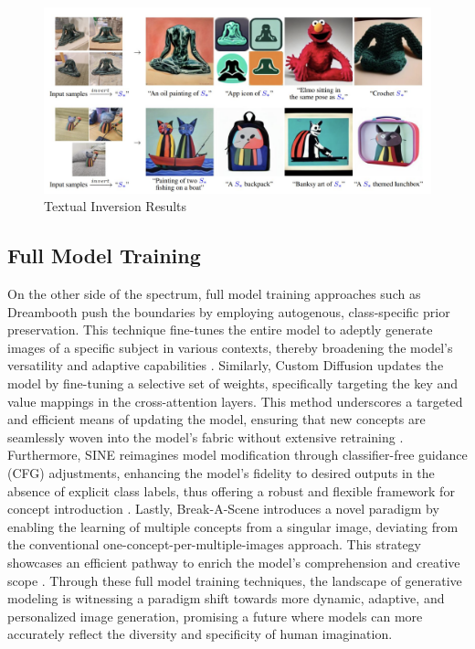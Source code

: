 \begin{figure}[h!]
    \centering
    \includegraphics[width=\textwidth]{images/ti.png}
    \caption{Textual Inversion Results \cite{textualinversion2022}}
\end{figure}


\subsection{Full Model Training}
On the other side of the spectrum, full model training approaches such as Dreambooth push the boundaries by employing autogenous, class-specific prior preservation. This technique fine-tunes the entire model to adeptly generate images of a specific subject in various contexts, thereby broadening the model's versatility and adaptive capabilities \cite{dreambooth}. Similarly, Custom Diffusion updates the model by fine-tuning a selective set of weights, specifically targeting the key and value mappings in the cross-attention layers. This method underscores a targeted and efficient means of updating the model, ensuring that new concepts are seamlessly woven into the model's fabric without extensive retraining \cite{customDiffusion}. Furthermore, SINE reimagines model modification through classifier-free guidance (CFG) adjustments, enhancing the model's fidelity to desired outputs in the absence of explicit class labels, thus offering a robust and flexible framework for concept introduction \cite{sine}. Lastly, Break-A-Scene introduces a novel paradigm by enabling the learning of multiple concepts from a singular image, deviating from the conventional one-concept-per-multiple-images approach. This strategy showcases an efficient pathway to enrich the model's comprehension and creative scope \cite{breakAScene}. Through these full model training techniques, the landscape of generative modeling is witnessing a paradigm shift towards more dynamic, adaptive, and personalized image generation, promising a future where models can more accurately reflect the diversity and specificity of human imagination.




